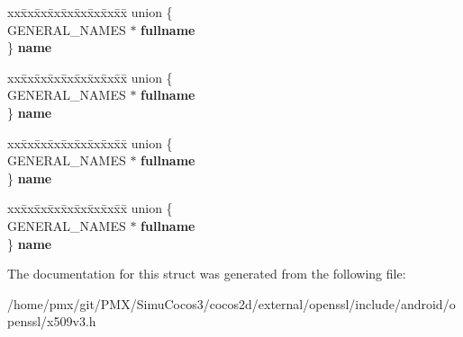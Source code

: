 \begin{DoxyCompactItemize}
\begin{tabbing}
\end{tabbing}\item 
\mbox{\label{structDIST__POINT__NAME__st_ae1b881c027f8a92735554981254367e7}} 
\begin{tabbing}
xx\=xx\=xx\=xx\=xx\=xx\=xx\=xx\=xx\=\kill
union \{\\
\>GENERAL\_NAMES $\ast$ {\bfseries fullname}\\
\} {\bfseries name}\\

\end{tabbing}\item 
\mbox{\label{structDIST__POINT__NAME__st_ac01fa4ab2fc5468789a80a1b6ad14d7a}} 
\begin{tabbing}
xx\=xx\=xx\=xx\=xx\=xx\=xx\=xx\=xx\=\kill
union \{\\
\>GENERAL\_NAMES $\ast$ {\bfseries fullname}\\
\} {\bfseries name}\\

\end{tabbing}\item 
\mbox{\label{structDIST__POINT__NAME__st_a62b2f2fd5cf59b5fb2ffca2c8a1fc75a}} 
\begin{tabbing}
xx\=xx\=xx\=xx\=xx\=xx\=xx\=xx\=xx\=\kill
union \{\\
\>GENERAL\_NAMES $\ast$ {\bfseries fullname}\\
\} {\bfseries name}\\

\end{tabbing}\item 
\mbox{\label{structDIST__POINT__NAME__st_a9e1749914f4693f3cdbd365710a45015}} 
\begin{tabbing}
xx\=xx\=xx\=xx\=xx\=xx\=xx\=xx\=xx\=\kill
union \{\\
\>GENERAL\_NAMES $\ast$ {\bfseries fullname}\\
\} {\bfseries name}\\

\end{tabbing}\end{DoxyCompactItemize}


The documentation for this struct was generated from the following file\+:\begin{DoxyCompactItemize}
\item 
/home/pmx/git/\+P\+M\+X/\+Simu\+Cocos3/cocos2d/external/openssl/include/android/openssl/x509v3.\+h\end{DoxyCompactItemize}
